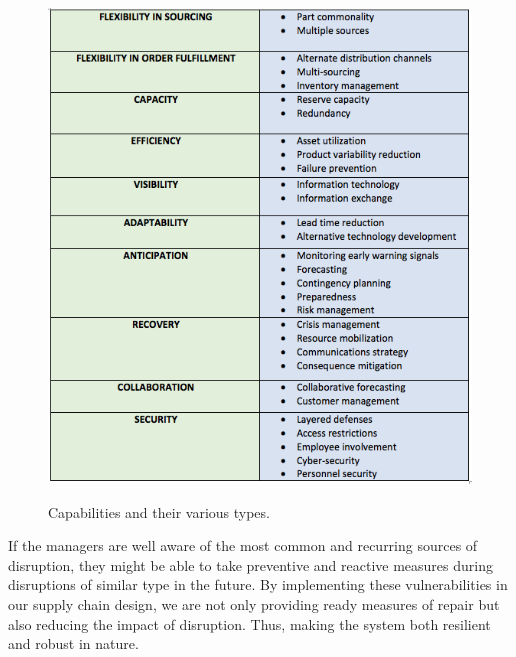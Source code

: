 \begin{figure}[H]
  \centering
  \includegraphics[width=6.0in]{figures/pdf/C1.png}\\
  \caption{Capabilities and their various types.}\label{Capabilities}
\end{figure}

 If the managers are well aware of the most common and recurring sources of disruption, they might be able to take preventive and reactive measures during disruptions of similar type in the future. By implementing these vulnerabilities in our supply chain design, we are not only providing ready measures of repair but also reducing the impact of disruption. Thus, making the system both resilient and robust in nature.  



